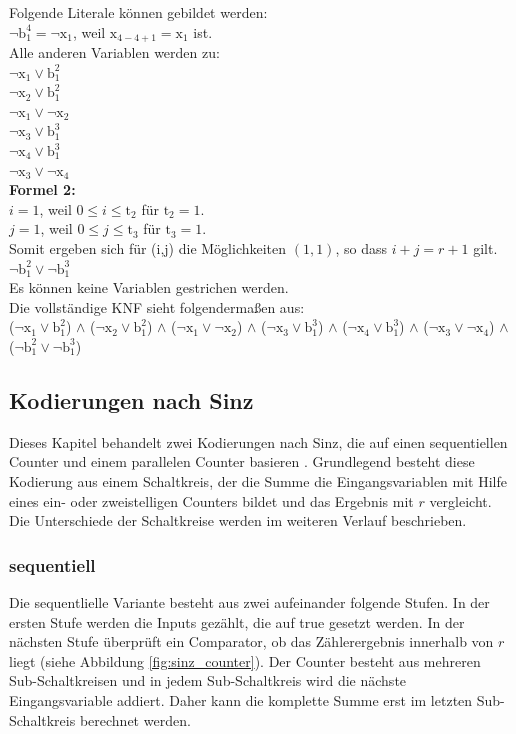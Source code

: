 \documentclass[a4,abstract=on]{scrartcl}
\begin{document}
Folgende Literale können gebildet werden:\\
$\neg \text{b}_1^4 = \neg \text{x}_1$, weil $\text{x}_{4-4+1}=\text{x}_1$ ist.\\
 Alle anderen Variablen werden zu:\\
$ \neg \text{x}_1 \vee \text{b}_1^2$\\
$\neg \text{x}_2 \vee  \text{b}_1^2$\\
$\neg \text{x}_1 \vee \neg \text{x}_2$\\
$\neg \text{x}_3 \vee \text{b}_1^3$\\
$\neg \text{x}_4 \vee \text{b}_1^3$\\
$\neg \text{x}_3 \vee \neg \text{x}_4$\\

\textbf{Formel 2:}\\
$i=1$, weil $0\leq i \leq \text{t}_2$ für $\text{t}_2 = 1$.\\
$j=1$, weil $0\leq j \leq \text{t}_3$ für $\text{t}_3=1$.\\
Somit ergeben sich für (i,j) die Möglichkeiten $(1,1)$, so dass $i+j = r+1$ gilt.\\
$\neg \text{b}_1^2 \vee \neg \text{b}_1^3$\\

Es können keine Variablen gestrichen werden.\\

Die vollständige KNF sieht folgendermaßen aus:\\
($ \neg \text{x}_1 \vee \text{b}_1^2$) $\wedge$ ($\neg \text{x}_2 \vee \text{b}_1^2$) $\wedge$ ($\neg \text{x}_1 \vee \neg \text{x}_2$) $\wedge$ ($\neg \text{x}_3 \vee \text{b}_1^3$) $\wedge$ ($\neg \text{x}_4 \vee \text{b}_1^3$) $\wedge$ ($\neg \text{x}_3 \vee \neg \text{x}_4$) $\wedge$ ($\neg \text{b}_1^2 \vee \neg \text{b}_1^3$)\\

	\subsection{Kodierungen nach Sinz}
Dieses Kapitel behandelt zwei Kodierungen nach Sinz, die auf einen sequentiellen Counter und einem parallelen Counter basieren \cite[][]{sinz}. Grundlegend besteht diese Kodierung aus einem Schaltkreis, der die Summe die Eingangsvariablen mit Hilfe eines ein- oder zweistelligen Counters bildet und das Ergebnis mit $r$ vergleicht. Die Unterschiede der Schaltkreise werden im weiteren Verlauf beschrieben.
		\subsubsection{sequentiell}
Die sequentlielle Variante besteht aus zwei aufeinander folgende Stufen. In der ersten Stufe werden die Inputs gezählt, die auf true gesetzt werden. In der nächsten Stufe überprüft ein Comparator, ob das Zählerergebnis innerhalb von $r$ liegt (siehe Abbildung \ref{fig:sinz_counter}). Der Counter besteht aus mehreren Sub-Schaltkreisen und in jedem Sub-Schaltkreis wird die nächste Eingangsvariable addiert. Daher kann die komplette Summe erst im letzten Sub-Schaltkreis berechnet werden. \\
\end{document}
